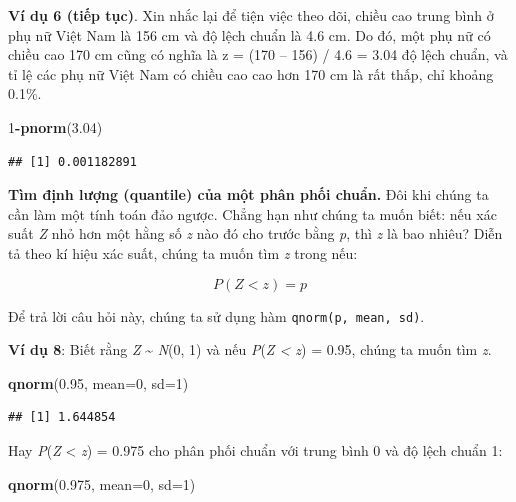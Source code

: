 \documentclass[
]{book}
\newenvironment{Shaded}{\begin{snugshade}}{\end{snugshade}}
\newcommand{\DataTypeTok}[1]{\textcolor[rgb]{0.13,0.29,0.53}{#1}}
\newcommand{\DecValTok}[1]{\textcolor[rgb]{0.00,0.00,0.81}{#1}}
\newcommand{\FloatTok}[1]{\textcolor[rgb]{0.00,0.00,0.81}{#1}}
\newcommand{\KeywordTok}[1]{\textcolor[rgb]{0.13,0.29,0.53}{\textbf{#1}}}
\newcommand{\NormalTok}[1]{#1}
\newcommand{\OperatorTok}[1]{\textcolor[rgb]{0.81,0.36,0.00}{\textbf{#1}}}
\begin{document}
\textbf{Ví dụ 6 (tiếp tục)}. Xin nhắc lại để tiện việc theo dõi, chiều cao trung bình ở phụ nữ Việt Nam là 156 cm và độ lệch chuẩn là 4.6 cm. Do đó, một phụ nữ có chiều cao 170 cm cũng có nghĩa là z = (170 -- 156) / 4.6 = 3.04 độ lệch chuẩn, và tỉ lệ các phụ nữ Việt Nam có chiều cao cao hơn 170 cm là rất thấp, chỉ khoảng 0.1\%.

\begin{Shaded}
\begin{Highlighting}[]
\DecValTok{1}\OperatorTok{{-}}\KeywordTok{pnorm}\NormalTok{(}\FloatTok{3.04}\NormalTok{) }
\end{Highlighting}
\end{Shaded}

\begin{verbatim}
## [1] 0.001182891
\end{verbatim}

\textbf{Tìm định lượng (quantile) của một phân phối chuẩn.} Đôi khi chúng ta cần làm một tính toán đảo ngược. Chẳng hạn như chúng ta muốn biết: nếu xác suất \emph{Z} nhỏ hơn một hằng số \emph{z} nào đó cho trước bằng \emph{p}, thì \emph{z} là bao nhiêu? Diễn tả theo kí hiệu xác suất, chúng ta muốn tìm \emph{z} trong nếu:

\[P(Z < z) = p\]

Để trả lời câu hỏi này, chúng ta sử dụng hàm \texttt{qnorm(p,\ mean,\ sd)}.

\textbf{Ví dụ 8}: Biết rằng \emph{Z} \textasciitilde{} \emph{N}(0, 1) và nếu \emph{P}(\emph{Z \textless{} z}) = 0.95, chúng ta muốn tìm \emph{z}.

\begin{Shaded}
\begin{Highlighting}[]
\KeywordTok{qnorm}\NormalTok{(}\FloatTok{0.95}\NormalTok{, }\DataTypeTok{mean=}\DecValTok{0}\NormalTok{, }\DataTypeTok{sd=}\DecValTok{1}\NormalTok{)}
\end{Highlighting}
\end{Shaded}

\begin{verbatim}
## [1] 1.644854
\end{verbatim}

Hay \emph{P}(\emph{Z} \textless{} \emph{z}) = 0.975 cho phân phối chuẩn với trung bình 0 và độ lệch chuẩn 1:

\begin{Shaded}
\begin{Highlighting}[]
\KeywordTok{qnorm}\NormalTok{(}\FloatTok{0.975}\NormalTok{, }\DataTypeTok{mean=}\DecValTok{0}\NormalTok{, }\DataTypeTok{sd=}\DecValTok{1}\NormalTok{)}
\end{Highlighting}
\end{Shaded}
\end{document}

